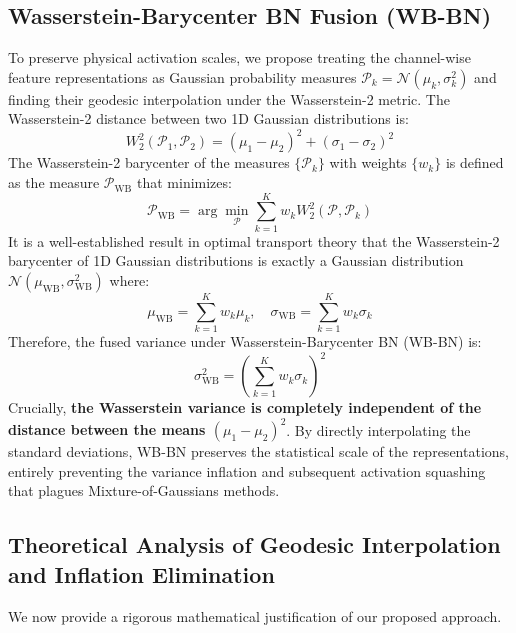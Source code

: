 \documentclass{article}
\theoremstyle{plain}
\theoremstyle{definition}
\theoremstyle{remark}
\begin{document}
\subsection{Wasserstein-Barycenter BN Fusion (WB-BN)}
To preserve physical activation scales, we propose treating the channel-wise feature representations as Gaussian probability measures $\mathcal{P}_k = \mathcal{N}(\mu_k, \sigma_k^2)$ and finding their geodesic interpolation under the Wasserstein-2 metric. The Wasserstein-2 distance between two 1D Gaussian distributions is:
\begin{equation}
  W_2^2(\mathcal{P}_1, \mathcal{P}_2) = (\mu_1 - \mu_2)^2 + (\sigma_1 - \sigma_2)^2
\end{equation}
The Wasserstein-2 barycenter of the measures $\{\mathcal{P}_k\}$ with weights $\{w_k\}$ is defined as the measure $\mathcal{P}_{\text{WB}}$ that minimizes:
\begin{equation}
  \mathcal{P}_{\text{WB}} = \arg\min_{\mathcal{P}} \sum_{k=1}^K w_k W_2^2(\mathcal{P}, \mathcal{P}_k)
\end{equation}
It is a well-established result in optimal transport theory that the Wasserstein-2 barycenter of 1D Gaussian distributions is exactly a Gaussian distribution $\mathcal{N}(\mu_{\text{WB}}, \sigma_{\text{WB}}^2)$ where:
\begin{equation}
  \mu_{\text{WB}} = \sum_{k=1}^K w_k \mu_k, \quad \sigma_{\text{WB}} = \sum_{k=1}^K w_k \sigma_k
\end{equation}
Therefore, the fused variance under Wasserstein-Barycenter BN (WB-BN) is:
\begin{equation}
  \sigma^2_{\text{WB}} = \left( \sum_{k=1}^K w_k \sigma_k \right)^2
\end{equation}
Crucially, \textbf{the Wasserstein variance is completely independent of the distance between the means $(\mu_1 - \mu_2)^2$}. By directly interpolating the standard deviations, WB-BN preserves the statistical scale of the representations, entirely preventing the variance inflation and subsequent activation squashing that plagues Mixture-of-Gaussians methods.

\subsection{Theoretical Analysis of Geodesic Interpolation and Inflation Elimination}

We now provide a rigorous mathematical justification of our proposed approach.
\end{document}
